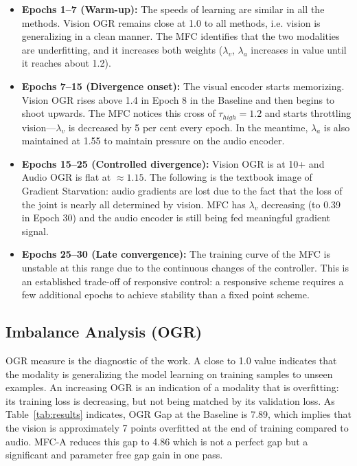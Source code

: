 \documentclass[preprint,a4paper, 10pt, 5p]{elsarticle}
\begin{document}
\begin{itemize}
    \item \textbf{Epochs 1--7 (Warm-up):} The speeds of learning are similar in all the methods. Vision OGR remains close at 1.0 to all methods, i.e. vision is generalizing in a clean manner. The MFC identifies that the two modalities are underfitting, and it increases both weights ($\lambda_v$, $\lambda_a$ increases in value until it reaches about 1.2).

    \item \textbf{Epochs 7--15 (Divergence onset):} The visual encoder starts memorizing. Vision OGR rises above 1.4 in Epoch 8 in the Baseline and then begins to shoot upwards. The MFC notices this cross of $\tau_{high} = 1.2$ and starts throttling vision---$\lambda_v$ is decreased by 5 per cent every epoch. In the meantime, $\lambda_a$ is also maintained at 1.55 to maintain pressure on the audio encoder.

    \item \textbf{Epochs 15--25 (Controlled divergence):} Vision OGR is at 10+ and Audio OGR is flat at $\approx 1.15$. The following is the textbook image of Gradient Starvation: audio gradients are lost due to the fact that the loss of the joint is nearly all determined by vision. MFC has $\lambda_v$ decreasing (to 0.39 in Epoch 30) and the audio encoder is still being fed meaningful gradient signal.

    \item \textbf{Epochs 25--30 (Late convergence):} The training curve of the MFC is unstable at this range due to the continuous changes of the controller. This is an established trade-off of responsive control: a responsive scheme requires a few additional epochs to achieve stability than a fixed point scheme.
\end{itemize}

\subsection{Imbalance Analysis (OGR)}

OGR measure is the diagnostic of the work. A close to 1.0 value indicates that the modality is generalizing the model learning on training samples to unseen examples. An increasing OGR is an indication of a modality that is overfitting: its training loss is decreasing, but not being matched by its validation loss. As Table~\ref{tab:results} indicates, OGR Gap at the Baseline is 7.89, which implies that the vision is approximately 7 points overfitted at the end of training compared to audio. MFC-A reduces this gap to 4.86 which is not a perfect gap but a significant and parameter free gap gain in one pass.
\end{document}
